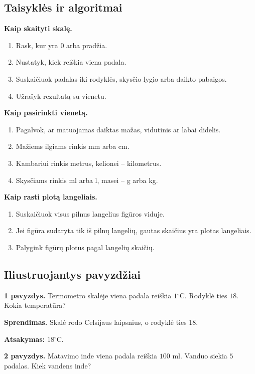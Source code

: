 \subsection{Taisyklės ir algoritmai}

\textbf{Kaip skaityti skalę.}
\begin{enumerate}
\item Rask, kur yra \(0\) arba pradžia.
\item Nustatyk, kiek reiškia viena padala.
\item Suskaičiuok padalas iki rodyklės, skysčio lygio arba daikto pabaigos.
\item Užrašyk rezultatą su vienetu.
\end{enumerate}

\textbf{Kaip pasirinkti vienetą.}
\begin{enumerate}
\item Pagalvok, ar matuojamas daiktas mažas, vidutinis ar labai didelis.
\item Mažiems ilgiams rinkis mm arba cm.
\item Kambariui rinkis metrus, kelionei -- kilometrus.
\item Skysčiams rinkis ml arba l, masei -- g arba kg.
\end{enumerate}

\textbf{Kaip rasti plotą langeliais.}
\begin{enumerate}
\item Suskaičiuok visus pilnus langelius figūros viduje.
\item Jei figūra sudaryta tik iš pilnų langelių, gautas skaičius yra plotas langeliais.
\item Palygink figūrų plotus pagal langelių skaičių.
\end{enumerate}

\subsection{Iliustruojantys pavyzdžiai}

\textbf{1 pavyzdys.} Termometro skalėje viena padala reiškia \(1{}^{\circ}\text{C}\). Rodyklė ties \(18\). Kokia temperatūra?

\textbf{Sprendimas.} Skalė rodo Celsijaus laipsnius, o rodyklė ties \(18\).

\textbf{Atsakymas:} \(18{}^{\circ}\text{C}\).

\textbf{2 pavyzdys.} Matavimo inde viena padala reiškia \(100\) ml. Vanduo siekia \(5\) padalas. Kiek vandens inde?

